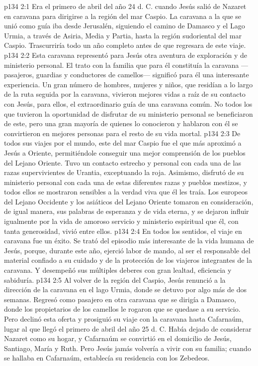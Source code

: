 \vs p134 2:1 Era el primero de abril del año 24 d. C. cuando Jesús salió de Nazaret en caravana para dirigirse a la región del mar Caspio. La caravana a la que se unió como guía iba desde Jerusalén, siguiendo el camino de Damasco y el Lago Urmia, a través de Asiria, Media y Partia, hasta la región sudoriental del mar Caspio. Trascurriría todo un año completo antes de que regresara de este viaje.
\vs p134 2:2 Esta caravana representó para Jesús otra aventura de exploración y de ministerio personal. El trato con la familia que para él constituía la caravana ---pasajeros, guardias y conductores de camellos--- significó para él una interesante experiencia. Un gran número de hombres, mujeres y niños, que residían a lo largo de la ruta seguida por la caravana, vivieron mejores vidas a raíz de su contacto con Jesús, para ellos, el extraordinario guía de una caravana común. No todos los que tuvieron la oportunidad de disfrutar de su ministerio personal se beneficiaron de este, pero una gran mayoría de quienes lo conocieron y hablaron con él se convirtieron en mejores personas para el resto de su vida mortal.
\vs p134 2:3 De todos sus viajes por el mundo, este del mar Caspio fue el que más aproximó a Jesús a Oriente, permitiéndole conseguir una mejor comprensión de los pueblos del Lejano Oriente. Tuvo un contacto estrecho y personal con cada una de las razas supervivientes de Urantia, exceptuando la roja. Asimismo, disfrutó de su ministerio personal con cada una de estas diferentes razas y pueblos mestizos, y todos ellos se mostraron sensibles a la verdad viva que él les traía. Los europeos del Lejano Occidente y los asiáticos del Lejano Oriente tomaron en consideración, de igual manera, sus palabras de esperanza y de vida eterna, y se dejaron influir igualmente por la vida de amoroso servicio y ministerio espiritual que él, con tanta generosidad, vivió entre ellos.
\vs p134 2:4 \pc En todos los sentidos, el viaje en caravana fue un éxito. Se trató del episodio más interesante de la vida humana de Jesús, porque, durante este año, ejerció labor de mando, al ser el responsable del material confiado a su cuidado y de la protección de los viajeros integrantes de la caravana. Y desempeñó sus múltiples deberes con gran lealtad, eficiencia y sabiduría.
\vs p134 2:5 Al volver de la región del Caspio, Jesús renunció a la dirección de la caravana en el lago Urmia, donde se detuvo por algo más de dos semanas. Regresó como pasajero en otra caravana que se dirigía a Damasco, donde los propietarios de los camellos le rogaron que se quedase a su servicio. Pero declinó esta oferta y prosiguió su viaje con la caravana hasta Cafarnaúm, lugar al que llegó el primero de abril del año 25 d. C. Había dejado de considerar Nazaret como su hogar, y Cafarnaúm se convirtió en el domicilio de Jesús, Santiago, María y Ruth. Pero Jesús jamás volvería a vivir con su familia; cuando se hallaba en Cafarnaúm, establecía su residencia con los Zebedeos.
